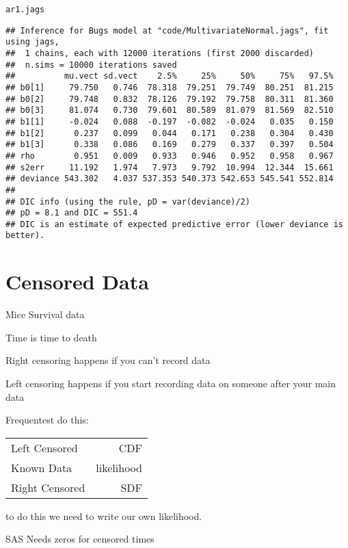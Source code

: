 \documentclass[12pt,letterpaper,oneside]{article}\usepackage{graphicx, color}
\makeatletter
\newenvironment{kframe}{%
 \def\at@end@of@kframe{}%
 \ifinner\ifhmode%
  \def\at@end@of@kframe{\end{minipage}}%
  \begin{minipage}{\columnwidth}%
 \fi\fi%
 \def\FrameCommand##1{\hskip\@totalleftmargin \hskip-\fboxsep
 \colorbox{shadecolor}{##1}\hskip-\fboxsep
     \hskip-\linewidth \hskip-\@totalleftmargin \hskip\columnwidth}%
 \MakeFramed {\advance\hsize-\width
   \@totalleftmargin\z@ \linewidth\hsize
   \@setminipage}}%
 {\par\unskip\endMakeFramed%
 \at@end@of@kframe}
\newenvironment{knitrout}{}{} %
\newcommand{\dateTaken}{January 7, 2013}
\makeatother
\begin{document}
\begin{knitrout}\scriptsize
{}\color{fgcolor}\begin{kframe}
\begin{alltt}
ar1.jags
\end{alltt}
\begin{verbatim}
## Inference for Bugs model at "code/MultivariateNormal.jags", fit using jags,
##  1 chains, each with 12000 iterations (first 2000 discarded)
##  n.sims = 10000 iterations saved
##          mu.vect sd.vect    2.5%     25%     50%     75%   97.5%
## b0[1]     79.750   0.746  78.318  79.251  79.749  80.251  81.215
## b0[2]     79.748   0.832  78.126  79.192  79.758  80.311  81.360
## b0[3]     81.074   0.730  79.601  80.589  81.079  81.569  82.510
## b1[1]     -0.024   0.088  -0.197  -0.082  -0.024   0.035   0.150
## b1[2]      0.237   0.099   0.044   0.171   0.238   0.304   0.430
## b1[3]      0.338   0.086   0.169   0.279   0.337   0.397   0.504
## rho        0.951   0.009   0.933   0.946   0.952   0.958   0.967
## s2err     11.192   1.974   7.973   9.792  10.994  12.344  15.661
## deviance 543.302   4.037 537.353 540.373 542.653 545.541 552.814
## 
## DIC info (using the rule, pD = var(deviance)/2)
## pD = 8.1 and DIC = 551.4
## DIC is an estimate of expected predictive error (lower deviance is better).
\end{verbatim}
\end{kframe}
\end{knitrout}

\renewcommand{\dateTaken}{April 11, 2013}
\daysep
\section{Censored Data} %
\label{sec:censored_data}
Mice Survival data

Time is time to death

Right censoring happens if you can't record data

Left censoring happens if you start recording data on someone after your main data

Frequentest do this:
\begin{tabular}{l r}
 Left Censored & CDF \\
 Known Data & likelihood \\
 Right Censored & SDF \\
\end{tabular}

to do this we need to write our own likelihood.

SAS Needs zeros for censored times
\end{document}
